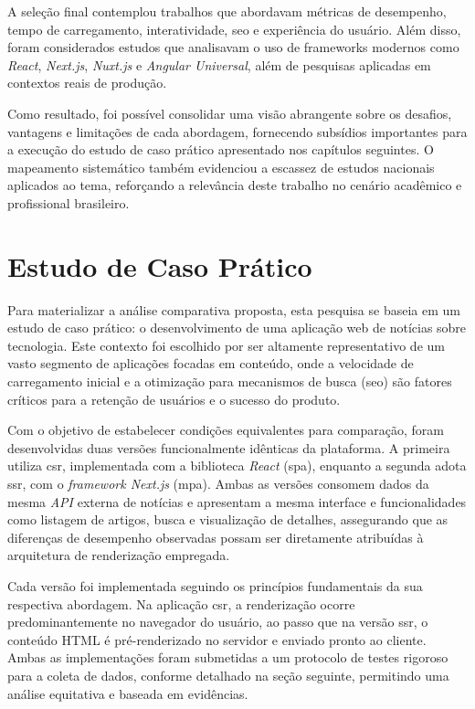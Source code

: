 A seleção final contemplou trabalhos que abordavam métricas de desempenho, tempo de carregamento, interatividade, \acrshort{seo} e experiência do usuário. Além disso, foram considerados estudos que analisavam o uso de frameworks modernos como \textit{React}, \textit{Next.js}, \textit{Nuxt.js} e \textit{Angular Universal}, além de pesquisas aplicadas em contextos reais de produção.

Como resultado, foi possível consolidar uma visão abrangente sobre os desafios, vantagens e limitações de cada abordagem, fornecendo subsídios importantes para a execução do estudo de caso prático apresentado nos capítulos seguintes. O mapeamento sistemático também evidenciou a escassez de estudos nacionais aplicados ao tema, reforçando a relevância deste trabalho no cenário acadêmico e profissional brasileiro.


\section{Estudo de Caso Prático}
\label{sec:estudo-de-caso-pratico}

Para materializar a análise comparativa proposta, esta pesquisa se baseia em um estudo de caso prático: o desenvolvimento de uma aplicação web de notícias sobre tecnologia. Este contexto foi escolhido por ser altamente representativo de um vasto segmento de aplicações focadas em conteúdo, onde a velocidade de carregamento inicial e a otimização para mecanismos de busca (\acrshort{seo}) são fatores críticos para a retenção de usuários e o sucesso do produto.

Com o objetivo de estabelecer condições equivalentes para comparação, foram desenvolvidas duas versões funcionalmente idênticas da plataforma. A primeira utiliza \acrfull{csr}, implementada com a biblioteca \textit{React} (\acrshort{spa}), enquanto a segunda adota \acrfull{ssr}, com o \textit{framework Next.js} (\acrshort{mpa}). Ambas as versões consomem dados da mesma \textit{API} externa de notícias e apresentam a mesma interface e funcionalidades como listagem de artigos, busca e visualização de detalhes, assegurando que as diferenças de desempenho observadas possam ser diretamente atribuídas à arquitetura de renderização empregada.

Cada versão foi implementada seguindo os princípios fundamentais da sua respectiva abordagem. Na aplicação \acrshort{csr}, a renderização ocorre predominantemente no navegador do usuário, ao passo que na versão \acrshort{ssr}, o conteúdo HTML é pré-renderizado no servidor e enviado pronto ao cliente. Ambas as implementações foram submetidas a um protocolo de testes rigoroso para a coleta de dados, conforme detalhado na seção seguinte, permitindo uma análise equitativa e baseada em evidências.


